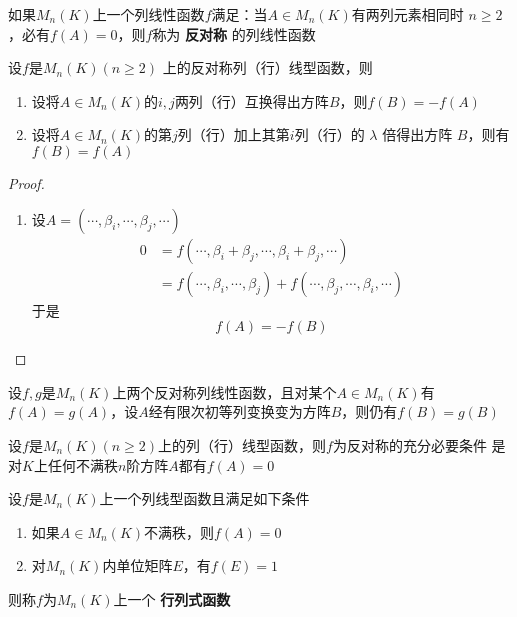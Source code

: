 \documentclass[11pt]{article}
\begin{document}
如果\(M_n(K)\)上一个列线性函数\(f\)满足：当\(A\in M_n(K)\)有两列元素相同时
\(n\ge2\)，必有\(f(A)=0\)，则\(f\)称为 \textbf{反对称} 的列线性函数

\begin{proposition}[]
设\(f\)是\(M_n(K)(n\ge2)\) 上的反对称列（行）线型函数，则
\begin{enumerate}
\item 设将\(A\in M_n(K)\)的\(i,j\)两列（行）互换得出方阵\(B\)，则\(f(B)=-f(A)\)
\item 设将\(A\in M_n(K)\)的第\(j\)列（行）加上其第\(i\)列（行）的 \(\lambda\) 倍得出方阵
\(B\)，则有 \(f(B)=f(A)\)
\end{enumerate}
\end{proposition}
\begin{proof}
\begin{enumerate}
\item 设\(A=(\cdots,\beta_i,\cdots,\beta_j,\cdots)\)
\begin{align*}
0&=f(\cdots,\beta_i+\beta_j,\cdots,\beta_i+\beta_j,\cdots)\\
&=f(\cdots,\beta_i,\cdots,\beta_j)+f(\cdots,\beta_j,\cdots,\beta_i,\cdots)
\end{align*}
于是
\begin{equation*}
f(A)=-f(B)
\end{equation*}
\end{enumerate}
\end{proof}

\begin{corollary}[]
设\(f,g\)是\(M_n(K)\)上两个反对称列线性函数，且对某个\(A\in M_n(K)\)有
\(f(A)=g(A)\)，设\(A\)经有限次初等列变换变为方阵\(B\)，则仍有\(f(B)=g(B)\)
\end{corollary}

\begin{corollary}[]
设\(f\)是\(M_n(K)(n\ge2)\)上的列（行）线型函数，则\(f\)为反对称的充分必要条件
是对\(K\)上任何不满秩\(n\)阶方阵\(A\)都有\(f(A)=0\)
\end{corollary}

\begin{definition}[]
设\(f\)是\(M_n(K)\)上一个列线型函数且满足如下条件
\begin{enumerate}
\item 如果\(A\in M_n(K)\)不满秩，则\(f(A)=0\)
\item 对\(M_n(K)\)内单位矩阵\(E\)，有\(f(E)=1\)
\end{enumerate}


则称\(f\)为\(M_n(K)\)上一个 \textbf{行列式函数}
\end{definition}
\end{document}
